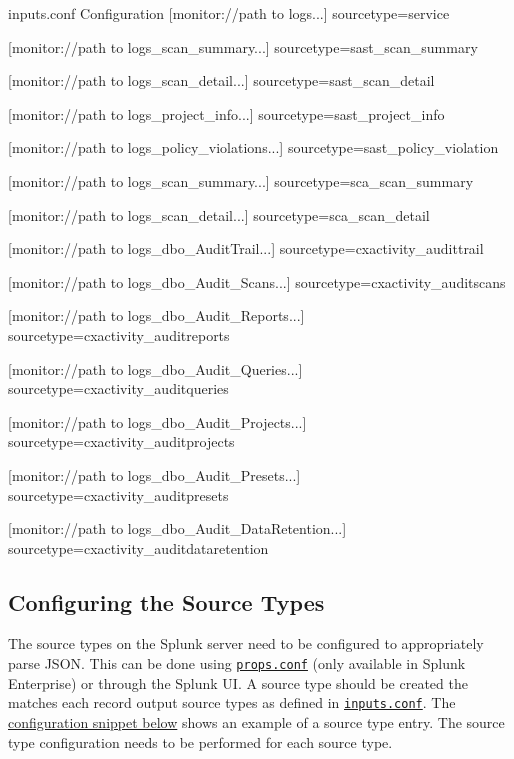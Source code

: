 \begin{code}{inputs.conf Configuration}{\label{lst:inputsconf}}{}
[monitor://{path to logs}\CxAnalytixService...]
sourcetype=service

[monitor://{path to logs}\sast_scan_summary...]
sourcetype=sast_scan_summary

[monitor://{path to logs}\sast_scan_detail...]
sourcetype=sast_scan_detail

[monitor://{path to logs}\sast_project_info...]
sourcetype=sast_project_info

[monitor://{path to logs}\sast_policy_violations...]
sourcetype=sast_policy_violation

[monitor://{path to logs}\sca_scan_summary...]
sourcetype=sca_scan_summary

[monitor://{path to logs}\sca_scan_detail...]
sourcetype=sca_scan_detail

[monitor://{path to logs}\CxActivity_dbo_AuditTrail...]
sourcetype=cxactivity_audittrail

[monitor://{path to logs}\CxActivity_dbo_Audit_Scans...]
sourcetype=cxactivity_auditscans

[monitor://{path to logs}\CxActivity_dbo_Audit_Reports...]
sourcetype=cxactivity_auditreports

[monitor://{path to logs}\CxActivity_dbo_Audit_Queries...]
sourcetype=cxactivity_auditqueries

[monitor://{path to logs}\CxActivity_dbo_Audit_Projects...]
sourcetype=cxactivity_auditprojects

[monitor://{path to logs}\CxActivity_dbo_Audit_Presets...]
sourcetype=cxactivity_auditpresets

[monitor://{path to logs}\CxActivity_dbo_Audit_DataRetention...]
sourcetype=cxactivity_auditdataretention
\end{code}

\subsection{Configuring the Source Types}

The source types on the Splunk server need to be configured to appropriately parse JSON.  
This can be done using \href{https://docs.splunk.com/Documentation/Splunk/latest/Admin/Propsconf}{\texttt{props.conf}} (only available in Splunk Enterprise) 
or through the Splunk UI. A source type should be created the matches each record output source types as defined in 
\href{https://docs.splunk.com/Documentation/Splunk/latest/Admin/Inputsconf}{\texttt{inputs.conf}}.  The \hyperref[lst:sourcetypes]{configuration snippet below} shows an example
of a source type entry.  The source type configuration needs to be performed for each source type.


